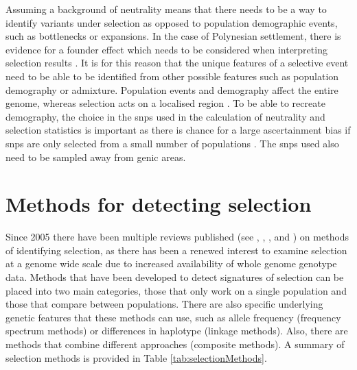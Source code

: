 \documentclass[twoside,openright]{report}
\begin{document}
Assuming a background of neutrality means that there needs to be a way
to identify variants under selection as opposed to population
demographic events, such as bottlenecks or expansions. In the case of
Polynesian settlement, there is evidence for a founder effect which
needs to be considered when interpreting selection results
\citep{Kayser2006a}. It is for this reason that the unique features of a
selective event need to be able to be identified from other possible
features such as population demography or admixture. Population events
and demography affect the entire genome, whereas selection acts on a
localised region \citep{Stajich2005}. To be able to recreate demography,
the choice in the \glspl{snp} used in the calculation of neutrality and
selection statistics is important as there is chance for a large
ascertainment bias if \glspl{snp} are only selected from a small number
of populations \citep{Wall2008}. The \glspl{snp} used also need to be
sampled away from genic areas.

\section{Methods for detecting selection}\label{selMethods}

Since 2005 there have been multiple reviews published (see
\citet{Nielsen2005}, \citet{sabeti2006positive}, \citet{Utsunomiya2015},
\citet{Vitti2013} and \citet{Haasl2016}) on methods of identifying
selection, as there has been a renewed interest to examine selection at
a genome wide scale due to increased availability of whole genome
genotype data. Methods that have been developed to detect signatures of
selection can be placed into two main categories, those that only work
on a single population and those that compare between populations. There
are also specific underlying genetic features that these methods can
use, such as allele frequency (frequency spectrum methods) or
differences in haplotype (linkage methods). Also, there are methods that
combine different approaches (composite methods). A summary of selection
methods is provided in Table \ref{tab:selectionMethods}.
\end{document}
